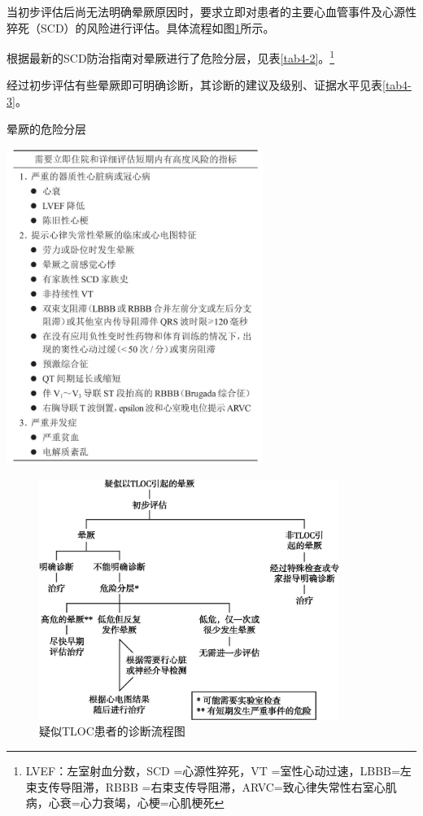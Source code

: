 当初步评估后尚无法明确晕厥原因时，要求立即对患者的主要心血管事件及心源性猝死（SCD）的风险进行评估。具体流程如图\ref{fig4-1}所示。

根据最新的SCD防治指南对晕厥进行了危险分层，见表\ref{tab4-2}。\footnote{LVEF：左室射血分数，SCD =心源性猝死，VT =室性心动过速，LBBB=左束支传导阻滞，RBBB =右束支传导阻滞，ARVC=致心律失常性右室心肌病，心衰=心力衰竭，心梗=心肌梗死}

经过初步评估有些晕厥即可明确诊断，其诊断的建议及级别、证据水平见表\ref{tab4-3}。

\begin{table}[htbp]
\centering
\caption{晕厥的危险分层}
\label{tab4-2}
\includegraphics[width=3.28125in,height=4.04167in]{./images/Image00018.jpg}
\end{table}


\begin{figure}[!htbp]
 \centering
 \includegraphics[width=3.84375in,height=3.08333in]{./images/Image00019.jpg}
 \captionsetup{justification=centering}
 \caption{疑似TLOC患者的诊断流程图}
 \label{fig4-1}
  \end{figure} 

